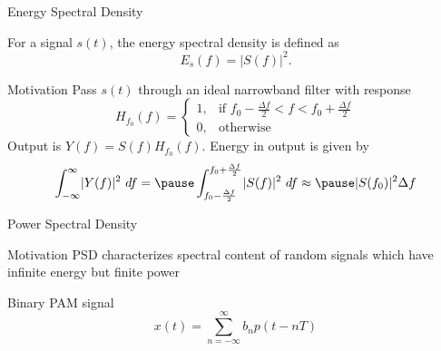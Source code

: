 \documentclass[t]{beamer}
\begin{document}
\begin{frame}{Energy Spectral Density}
  \footnotesize
  \pause
  \begin{definition}[]
    For a signal $s(t)$, the energy spectral density is defined as
    \begin{equation*}
      E_s(f) = \lvert S(f) \rvert^2.
    \end{equation*}
  \end{definition}
  \pause
  \begin{block}{Motivation}
    \pause
    Pass $s(t)$ through an ideal narrowband filter with response
    \begin{equation*}
    H_{f_0}(f) = \left\{
          \begin{array}{rr}
          1, & \text{if } f_0 - \frac{\Delta f}{2} < f < f_0 + \frac{\Delta f}{2} \\
          0, & \text{otherwise} 
          \end{array}
        \right.
    \end{equation*}
    \pause
    Output is $Y(f) = S(f)H_{f_0}(f)$. \pause  Energy in output is given by
    \begin{equation*}
      \int_{-\infty}^{\infty} \lvert Y(f) \rvert^2 \ df = \pause \int_{f_0-\frac{\Delta f}{2}}^{f_0+\frac{\Delta f}{2}} \lvert S(f) \rvert^2 \ df  \approx  \pause\lvert S(f_0) \rvert^2 \Delta f 
    \end{equation*}
  \end{block}
  \normalsize
\end{frame}

\begin{frame}{Power Spectral Density}
  \footnotesize
  \pause
  \begin{block}{Motivation}
    PSD characterizes spectral content of random signals which have infinite energy but finite power 
  \end{block}
    \pause
    \begin{example} 
    \pause 
    Binary PAM signal
      \begin{equation*}
      x(t) = \sum_{n=-\infty}^{\infty} b_n p(t-nT)
      \end{equation*}
    \end{example}
  \normalsize
\end{frame}
\end{document}
